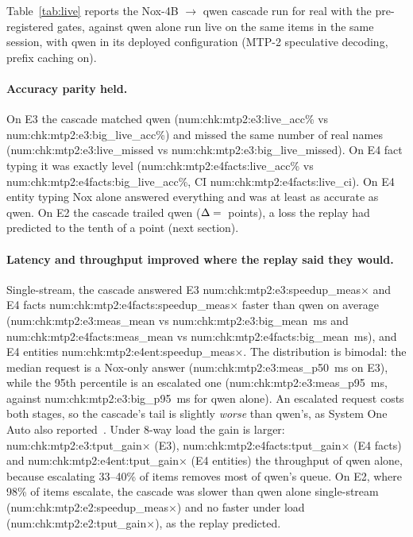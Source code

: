 \documentclass[11pt]{article}
\newcommand{\N}[1]{\csname num:#1\endcsname}
\begin{document}
Table~\ref{tab:live} reports the Nox-4B $\rightarrow$ qwen cascade run for real with the
pre-registered gates, against qwen alone run live on the same items in the same session, with qwen
in its deployed configuration (MTP-2 speculative decoding, prefix caching on).

\begin{table}[t]
\centering
\small
\setlength{\tabcolsep}{4pt}
\resizebox{\textwidth}{!}{}
\caption{The live cascade (Nox-4B on spark2 $\rightarrow$ qwen on spark1) against qwen alone,
measured in the same session. Accuracy and mean latency per item are single-stream ($c=1$). $\Delta$
is cascade minus qwen with a paired bootstrap CI. Throughput uses 8 concurrent clients over the whole
task. Latency is wall time at the client, including both network hops.}
\label{tab:live}
\end{table}

\paragraph{Accuracy parity held.} On E3 the cascade matched qwen (\N{chk:mtp2:e3:live_acc}\% vs
\N{chk:mtp2:e3:big_live_acc}\%) and missed the same number of real names
(\N{chk:mtp2:e3:live_missed} vs \N{chk:mtp2:e3:big_live_missed}). On E4 fact typing it was
exactly level (\N{chk:mtp2:e4facts:live_acc}\% vs \N{chk:mtp2:e4facts:big_live_acc}\%, CI
\N{chk:mtp2:e4facts:live_ci}). On E4 entity typing Nox alone answered everything and was at least as
accurate as qwen. On E2 the cascade trailed qwen ($\Delta = \N{chk:mtp2:e2:live_d_big}$~points), a
loss the replay had predicted to the tenth of a point (next section).

\paragraph{Latency and throughput improved where the replay said they would.} Single-stream, the
cascade answered E3 \N{chk:mtp2:e3:speedup_meas}$\times$ and E4 facts
\N{chk:mtp2:e4facts:speedup_meas}$\times$ faster than qwen on average
(\N{chk:mtp2:e3:meas_mean} vs \N{chk:mtp2:e3:big_mean}~ms and \N{chk:mtp2:e4facts:meas_mean} vs
\N{chk:mtp2:e4facts:big_mean}~ms), and E4 entities \N{chk:mtp2:e4ent:speedup_meas}$\times$. The
distribution is bimodal: the median request is a Nox-only answer
(\N{chk:mtp2:e3:meas_p50}~ms on E3), while the 95th percentile is an escalated one
(\N{chk:mtp2:e3:meas_p95}~ms, against \N{chk:mtp2:e3:big_p95}~ms for qwen alone). An escalated
request costs both stages, so the cascade's tail is slightly \emph{worse} than qwen's, as
System One Auto also reported~\cite{sysoneauto}. Under 8-way load the gain is larger:
\N{chk:mtp2:e3:tput_gain}$\times$ (E3), \N{chk:mtp2:e4facts:tput_gain}$\times$ (E4 facts) and
\N{chk:mtp2:e4ent:tput_gain}$\times$ (E4 entities) the throughput of qwen alone, because escalating
33--40\% of items removes most of qwen's queue. On E2, where 98\% of items escalate, the cascade
was slower than qwen alone single-stream (\N{chk:mtp2:e2:speedup_meas}$\times$) and no faster under
load (\N{chk:mtp2:e2:tput_gain}$\times$), as the replay predicted.
\end{document}
